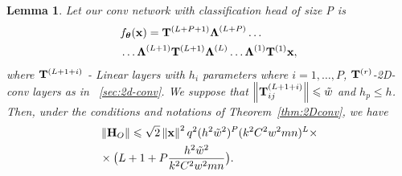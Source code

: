 \documentclass[conference]{IEEEtran}
\newtheorem{lemma}{Lemma}
\begin{document}
\begin{lemma}\label{lemma:fc-head}
Let our conv network with classification head of size P is
\begin{align*}
& f_{\boldsymbol{\theta}}(\mathbf{x}) = \mathbf{T}^{(L+P+1)}\boldsymbol{\Lambda}^{(L+P)} \dots \\ 
& \dots \boldsymbol{\Lambda}^{(L+1)}\mathbf{T}^{(L+1)}\boldsymbol{\Lambda}^{(L)}\dots \boldsymbol{\Lambda}^{(1)}\mathbf{T}^{(1)}\mathbf{x},
\end{align*}
where $\mathbf{T}^{(L+1+i)}$ - Linear layers with $h_{i}$ parameters where $i=1,\dots,P$, $\mathbf{T}^{(r)}$-2D-conv layers as in ~\ref{sec:2d-conv}. We suppose that $\left\|\mathbf{T}^{(L+1+i)}_{ij}\right\| \leqslant \tilde{w}$ and $h_p \leqslant h$.
Then, under the conditions and notations of Theorem~\ref{thm:2Dconv}, we have
\begin{align*}
& \left\|\mathbf{H}_{O}\right\| \leqslant \sqrt{2}\left\|\mathbf{x}\right\|^2q^2(h^2\tilde{w}^2)^P(k^2C^2w^2mn)^L\times \\
& \times \big(L + 1 + P\frac{h^2\tilde{w}^2}{k^2C^2w^2mn}\big).
\end{align*}
\end{lemma}
\end{document}
